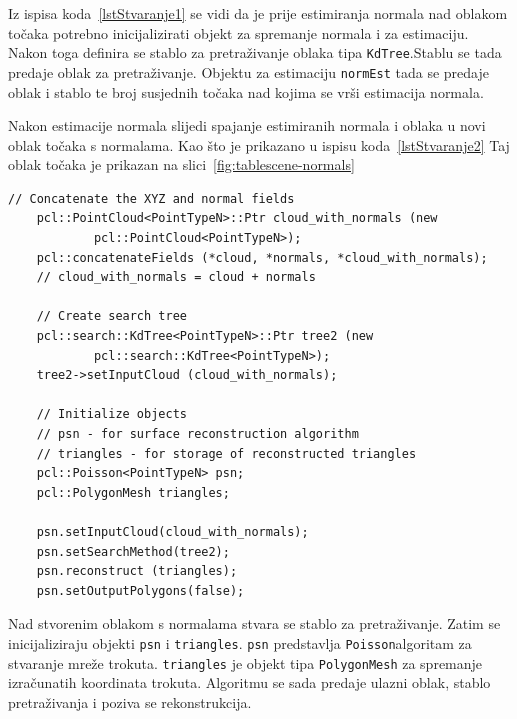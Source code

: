 Iz ispisa koda~\ref{lstStvaranje1} se vidi da je prije estimiranja
normala nad oblakom točaka potrebno inicijalizirati objekt za
spremanje normala i za estimaciju. Nakon toga definira se
stablo za pretraživanje oblaka tipa \texttt{KdTree}.\footnotemark[1]
Stablu se tada predaje oblak za pretraživanje. Objektu za
estimaciju \texttt{normEst} tada se predaje oblak i stablo te broj
susjednih točaka nad kojima se vrši estimacija
normala\footnotemark[2]. 


Nakon estimacije normala slijedi spajanje estimiranih normala i oblaka u
novi oblak točaka s normalama. Kao što je prikazano u ispisu
koda~\ref{lstStvaranje2} Taj oblak točaka je prikazan na 
slici~\ref{fig:tablescene-normals}

\newpage
\begin{lstlisting}[label=lstStvaranje2,caption={Dio izvornog koda o
    stvaranju mreže iz funkcije \texttt{reconstruct\_mesh()} }]
    // Concatenate the XYZ and normal fields
    pcl::PointCloud<PointTypeN>::Ptr cloud_with_normals (new
            pcl::PointCloud<PointTypeN>);
    pcl::concatenateFields (*cloud, *normals, *cloud_with_normals);
    // cloud_with_normals = cloud + normals

    // Create search tree 
    pcl::search::KdTree<PointTypeN>::Ptr tree2 (new
            pcl::search::KdTree<PointTypeN>);
    tree2->setInputCloud (cloud_with_normals);

    // Initialize objects 
    // psn - for surface reconstruction algorithm
    // triangles - for storage of reconstructed triangles
    pcl::Poisson<PointTypeN> psn;
    pcl::PolygonMesh triangles;

    psn.setInputCloud(cloud_with_normals);
    psn.setSearchMethod(tree2);
    psn.reconstruct (triangles);
    psn.setOutputPolygons(false);
\end{lstlisting}

Nad stvorenim oblakom s normalama stvara se stablo za pretraživanje.
Zatim se inicijaliziraju objekti \texttt{psn} i \texttt{triangles}.
\texttt{psn} predstavlja \texttt{Poisson}\footnotemark[1] algoritam za
stvaranje mreže trokuta. \texttt{triangles} je objekt tipa
\texttt{PolygonMesh} za spremanje izračunatih koordinata trokuta.
Algoritmu se sada predaje ulazni oblak, stablo pretraživanja i poziva se
rekonstrukcija.

